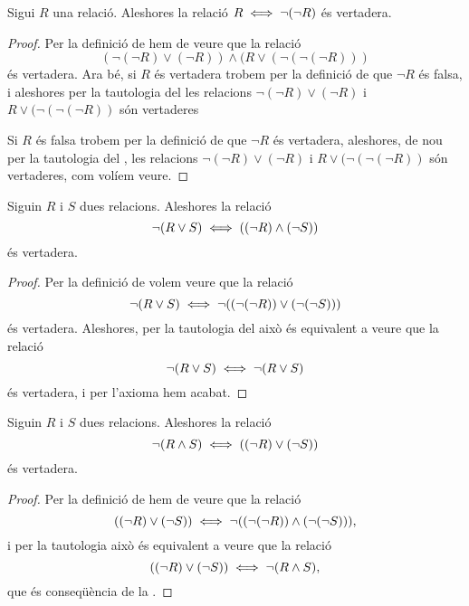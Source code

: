 \documentclass[../Apunts.tex]{subfiles}
\begin{document}
	\begin{tautology}
		\label{taut:R és equivalent a no no R}
		Sigui \(R\) una relació. Aleshores la relació \(R\iff\lnot(\lnot R)\) és vertadera.
		\begin{proof}
			Per la definició de  hem de veure que la relació
			\[(\lnot(\lnot R)\lor(\lnot R))\land(R\lor(\lnot(\lnot(\lnot R)))\]
			és vertadera. Ara bé, si \(R\) és vertadera trobem per la definició de  que \(\lnot R\) és falsa, i aleshores per la tautologia del  les relacions \(\lnot(\lnot R)\lor(\lnot R)\) i \(R\lor(\lnot(\lnot(\lnot R))\) són vertaderes
			
			Si \(R\) és falsa trobem per la definició de  que \(\lnot R\) és vertadera, aleshores, de nou per la tautologia del , les relacions \(\lnot(\lnot R)\lor(\lnot R)\) i \(R\lor(\lnot(\lnot(\lnot R))\) són vertaderes, com volíem veure.
		\end{proof}
	\end{tautology}
	\begin{tautology}
		\label{taut:primera llei de De Morgan}
		Siguin \(R\) i \(S\) dues relacions. Aleshores la relació
		\[\lnot(R\lor S)\iff((\lnot R)\land(\lnot S))\]
		és vertadera.
		\begin{proof}
			Per la definició de  volem veure que la relació
			\[\lnot(R\lor S)\iff\lnot((\lnot(\lnot R))\lor(\lnot(\lnot S)))\]
			és vertadera. Aleshores, per la tautologia del  això és equivalent a veure que la relació
			\[\lnot(R\lor S)\iff\lnot(R\lor S)\]
			és vertadera, i per l'axioma  hem acabat.
		\end{proof}
	\end{tautology}
	\begin{tautology}
		\label{taut:segona llei de De Morgan}
		Siguin \(R\) i \(S\) dues relacions. Aleshores la relació
		\[\lnot(R\land S)\iff((\lnot R)\lor(\lnot S))\]
		és vertadera.
		\begin{proof}
			Per la definició de  hem de veure que la relació
			\[((\lnot R)\lor(\lnot S))\iff\lnot((\lnot(\lnot R))\land(\lnot (\lnot S))),\]
			i per la tautologia  això és equivalent a veure que la relació
			\[((\lnot R)\lor(\lnot S))\iff\lnot(R\land S),\]
			que és conseqüència de la \myref{taut:primera llei de De Morgan}.
		\end{proof}
	\end{tautology}
\end{document}
